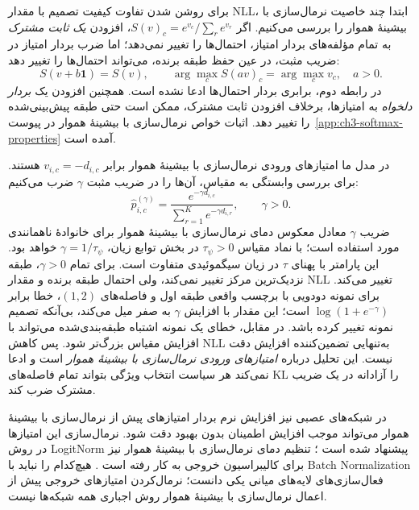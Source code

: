 برای روشن شدن تفاوت کیفیت تصمیم با مقدار NLL، ابتدا چند خاصیت نرمال‌سازی با بیشینهٔ هموار را بررسی می‌کنیم. اگر $S(v)_c=e^{v_c}/\sum_re^{v_r}$، افزودن \emph{یک ثابت مشترک} به تمام مؤلفه‌های بردار امتیاز، احتمال‌ها را تغییر نمی‌دهد؛ اما ضرب بردار امتیاز در ضریب مثبت، در عین حفظ طبقه برنده، می‌تواند احتمال‌ها را تغییر دهد:
\begin{equation}\label{cmp:eq:ch3-NLL-softmax-invariance}
S(v+b\mathbf1)=S(v),
\qquad
\arg\max_c S(av)_c=\arg\max_c v_c,\quad a>0.
\end{equation}
در رابطه دوم، برابری بردار احتمال‌ها ادعا نشده است. همچنین افزودن یک \emph{بردار دلخواه} به امتیازها، برخلاف افزودن ثابت مشترک، ممکن است حتی طبقه پیش‌بینی‌شده را تغییر دهد. اثبات خواص نرمال‌سازی با بیشینهٔ هموار در پیوست~\ref{app:ch3-softmax-properties} آمده است.

در مدل ما امتیازهای ورودی نرمال‌سازی با بیشینهٔ هموار برابر $v_{i,c}=-d_{i,c}$ هستند. برای بررسی وابستگی به مقیاس، آن‌ها را در ضریب مثبت $\gamma$ ضرب می‌کنیم:
\begin{equation}\label{cmp:eq:ch3-NLL-scaled-softmax}
\widehat p_{i,c}^{(\gamma)}
=\frac{e^{-\gamma d_{i,c}}}
{\sum_{r=1}^{K}e^{-\gamma d_{i,r}}},\qquad\gamma>0.
\end{equation}
ضریب $\gamma$ معادل معکوس دمای نرمال‌سازی با بیشینهٔ هموار برای
خانوادهٔ ناهمانندی مورد استفاده است؛
با نماد مقیاس $\tau_\psi>0$ در بخش توابع زیان،
$\gamma=1/\tau_\psi$ خواهد بود.
این پارامتر با پهنای $\tau$ در زیان سیگموئیدی
متفاوت است.
برای تمام $\gamma>0$، طبقه نزدیک‌ترین مرکز تغییر نمی‌کند،
ولی احتمال طبقه برنده و مقدار NLL تغییر می‌کند. برای نمونه دودویی با برچسب واقعی طبقه اول و فاصله‌های $(1,2)$، خطا برابر $\log(1+e^{-\gamma})$ است؛ این مقدار با افزایش $\gamma$ به صفر میل می‌کند، بی‌آنکه تصمیم نمونه تغییر کرده باشد. در مقابل، خطای یک نمونه اشتباه طبقه‌بندی‌شده می‌تواند با افزایش مقیاس بزرگ‌تر شود. پس کاهش NLL به‌تنهایی تضمین‌کننده افزایش دقت نیست. این تحلیل درباره \emph{امتیازهای ورودی نرمال‌سازی با بیشینهٔ هموار} است و ادعا نمی‌کند هر سیاست انتخاب ویژگی بتواند تمام فاصله‌های KL را آزادانه در یک ضریب مشترک ضرب کند.

در شبکه‌های عصبی نیز افزایش نرم بردار امتیازهای پیش از نرمال‌سازی با بیشینهٔ هموار می‌تواند موجب افزایش اطمینان بدون بهبود دقت شود. نرمال‌سازی این امتیازها در روش LogitNorm پیشنهاد شده است \cite{Wei2022LogitNorm}؛ تنظیم دمای نرمال‌سازی با بیشینهٔ هموار نیز برای کالیبراسیون خروجی به کار رفته است \cite{Guo2017Calibration}. هیچ‌کدام را نباید با Batch Normalization فعال‌سازی‌های لایه‌های میانی یکی دانست؛ نرمال‌کردن امتیازهای خروجی پیش از اعمال نرمال‌سازی با بیشینهٔ هموار روش اجباری همه شبکه‌ها نیست.

